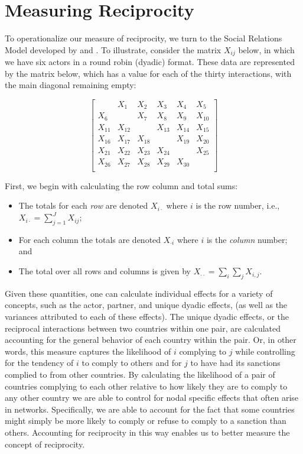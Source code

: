 \section*{Measuring Reciprocity}

To operationalize our measure of reciprocity, we turn to the Social Relations Model developed by \citet{kenny1994interpersonal} and \citet{dorff2013}. To illustrate, consider the matrix $X_{ij}$ below, in which we have six actors in a round robin (dyadic) format. These data are represented by the matrix below, which has a value for each of the thirty interactions, with the main diagonal remaining empty:

\singlespacing
\[
\left[
\begin{array}{cccccc}
 & X_{1}  & X_{2}  & X_{3} & X_{4} & X_{5} \\
X_{6}  &  & X_{7}  & X_{8} & X_{9} & X_{10} \\
X_{11}  & X_{12}  &    & X_{13} & X_{14} & X_{15} \\
X_{16}  & X_{17}  & X_{18}  &  & X_{19} & X_{20} \\
X_{21}  & X_{22}  & X_{23}  & X_{24} &   & X_{25} \\
X_{26}  & X_{27}  & X_{28}  & X_{29} & X_{30} &   \\
\end{array}
\right]
\]

\doublespacing
First, we begin with calculating the row column and total sums:

\begin{itemize}
	\item The totals for each \emph{ row} are denoted $X_{i \cdot}$ where $i$ is the row number, i.e.,
	~\\
	$X_{i \cdot} = \sum_{j=1}^{J} X_{ij}$;
	\item For each column the totals are denoted
	 $X_{\cdot i}$ where $i$ is the \emph{column} number; and 
	 \item The total over all rows and columns is given by $X_{\cdot \cdot} = \sum_i \sum_j X_{i,j}$.
 \end{itemize}
 
Given these quantities, one can calculate individual effects for a variety of concepts, such as the actor, partner, and unique dyadic effects, (as well as the variances attributed to each of these effects). The unique dyadic effects, or the reciprocal interactions between two countries within one pair, are calculated accounting for the general behavior of each country within the pair. Or, in other words, this measure captures the likelihood of $i$ complying to $j$ while controlling for the tendency of $i$ to comply to others and for $j$ to have had its sanctions complied to from other countries. By calculating the likelihood of a pair of countries complying to each other relative to how likely they are to comply to any other country we are able to control for nodal specific effects that often arise in networks. Specifically, we are able to account for the fact that some countries might simply be more likely to comply or refuse to comply to a sanction than others. Accounting for reciprocity in this way enables us to better measure the concept of reciprocity. 

